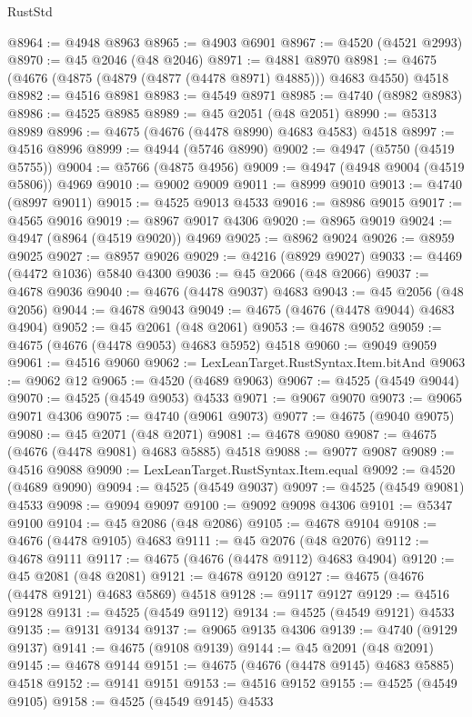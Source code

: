 \begin{lexlean}{RustStd}
\begin{coremodule}
{\begin{coremodule}
{{{{{{{{{{{{{{{{{{{{{{{{{{{{{{{{{{{{{{{{{{{{{{{{{{{{{{{{{{{{@8964 := @4948 @8963
@8965 := @4903 @6901
@8967 := @4520 (@4521 @2993)
@8970 := @45 @2046 (@48 @2046)
@8971 := @4881 @8970
@8981 := @4675 (@4676 (@4875 (@4879 (@4877 (@4478 @8971) @4885))) @4683 @4550) @4518
@8982 := @4516 @8981
@8983 := @4549 @8971
@8985 := @4740 (@8982 @8983)
@8986 := @4525 @8985
@8989 := @45 @2051 (@48 @2051)
@8990 := @5313 @8989
@8996 := @4675 (@4676 (@4478 @8990) @4683 @4583) @4518
@8997 := @4516 @8996
@8999 := @4944 (@5746 @8990)
@9002 := @4947 (@5750 (@4519 @5755))
@9004 := @5766 (@4875 @4956)
@9009 := @4947 (@4948 @9004 (@4519 @5806)) @4969
@9010 := @9002 @9009
@9011 := @8999 @9010
@9013 := @4740 (@8997 @9011)
@9015 := @4525 @9013 @4533
@9016 := @8986 @9015
@9017 := @4565 @9016
@9019 := @8967 @9017 @4306
@9020 := @8965 @9019
@9024 := @4947 (@8964 (@4519 @9020)) @4969
@9025 := @8962 @9024
@9026 := @8959 @9025
@9027 := @8957 @9026
@9029 := @4216 (@8929 @9027)
@9033 := @4469 (@4472 @1036) @5840 @4300
@9036 := @45 @2066 (@48 @2066)
@9037 := @4678 @9036
@9040 := @4676 (@4478 @9037) @4683
@9043 := @45 @2056 (@48 @2056)
@9044 := @4678 @9043
@9049 := @4675 (@4676 (@4478 @9044) @4683 @4904)
@9052 := @45 @2061 (@48 @2061)
@9053 := @4678 @9052
@9059 := @4675 (@4676 (@4478 @9053) @4683 @5952) @4518
@9060 := @9049 @9059
@9061 := @4516 @9060
@9062 := LexLeanTarget.RustSyntax.Item.bitAnd
@9063 := @9062 @12
@9065 := @4520 (@4689 @9063)
@9067 := @4525 (@4549 @9044)
@9070 := @4525 (@4549 @9053) @4533
@9071 := @9067 @9070
@9073 := @9065 @9071 @4306
@9075 := @4740 (@9061 @9073)
@9077 := @4675 (@9040 @9075)
@9080 := @45 @2071 (@48 @2071)
@9081 := @4678 @9080
@9087 := @4675 (@4676 (@4478 @9081) @4683 @5885) @4518
@9088 := @9077 @9087
@9089 := @4516 @9088
@9090 := LexLeanTarget.RustSyntax.Item.equal
@9092 := @4520 (@4689 @9090)
@9094 := @4525 (@4549 @9037)
@9097 := @4525 (@4549 @9081) @4533
@9098 := @9094 @9097
@9100 := @9092 @9098 @4306
@9101 := @5347 @9100
@9104 := @45 @2086 (@48 @2086)
@9105 := @4678 @9104
@9108 := @4676 (@4478 @9105) @4683
@9111 := @45 @2076 (@48 @2076)
@9112 := @4678 @9111
@9117 := @4675 (@4676 (@4478 @9112) @4683 @4904)
@9120 := @45 @2081 (@48 @2081)
@9121 := @4678 @9120
@9127 := @4675 (@4676 (@4478 @9121) @4683 @5869) @4518
@9128 := @9117 @9127
@9129 := @4516 @9128
@9131 := @4525 (@4549 @9112)
@9134 := @4525 (@4549 @9121) @4533
@9135 := @9131 @9134
@9137 := @9065 @9135 @4306
@9139 := @4740 (@9129 @9137)
@9141 := @4675 (@9108 @9139)
@9144 := @45 @2091 (@48 @2091)
@9145 := @4678 @9144
@9151 := @4675 (@4676 (@4478 @9145) @4683 @5885) @4518
@9152 := @9141 @9151
@9153 := @4516 @9152
@9155 := @4525 (@4549 @9105)
@9158 := @4525 (@4549 @9145) @4533
}}}}}}}}}}}}}}}}}}}}}}}}}}}}}}}}}}}}}}}}}}}}}}}}}}}}}}}}}}}}
\end{coremodule}}
\end{coremodule}
\end{lexlean}
